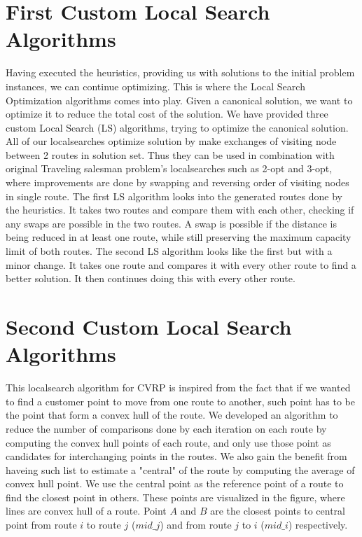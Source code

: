 \documentclass[12pt]{article}
\begin{document}
\section{First Custom Local Search Algorithms}
Having executed the heuristics, providing us with solutions to the initial problem instances, we can continue optimizing. This is where the Local Search Optimization algorithms comes into play. 
Given a canonical solution, we want to optimize it to reduce the total cost of the solution. We have provided three custom Local Search (LS) algorithms, trying to optimize the canonical solution.
All of our localsearches optimize solution by make exchanges of visiting node between 2 routes in solution set. Thus they can be used in combination with original Traveling salesman problem's localsearches such as 2-opt and 3-opt, where improvements are done by swapping and reversing order of visiting nodes in single route.
\newline
The first LS algorithm looks into the generated routes done by the heuristics. It takes two routes and compare them with each other, checking if any swaps are possible in the two routes. 
A swap is possible if the distance is being reduced in at least one route, while still preserving the maximum capacity limit of both routes. 
The second LS algorithm looks like the first but with a minor change. It takes one route and compares it with every other route to find a better solution. It then continues doing this 
with every other route. 

\section{Second Custom Local Search Algorithms} \label{ls2}
This localsearch algorithm for CVRP is inspired from the fact that if we wanted to find a customer point to move from one route to another, such point has to be the point that form a convex hull of the route. We developed an algorithm to reduce the number of comparisons done by each iteration on each route by computing the convex hull points of each route, and only use those point as candidates for interchanging points in the routes. 
We also gain the benefit from haveing such list to estimate a "central" of the route by computing the average of convex hull point. We use the central point as the reference point of a route to find the closest point in others. These points are visualized in the figure, where lines are convex hull of a route. Point \(A\) and \(B\) are the closest points to central point from route \(i\) to route \(j\) (\(mid\_j\)) and from route \(j\) to \(i\) (\(mid\_i\)) respectively.
\end{document}
